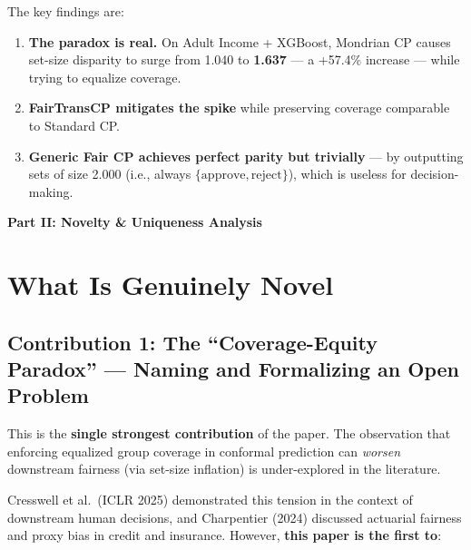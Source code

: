 \documentclass[11pt,a4paper]{article}
\begin{document}
\noindent The key findings are:

\begin{enumerate}[leftmargin=2em]
    \item \textbf{The paradox is real.} On Adult Income + XGBoost, Mondrian CP causes set-size disparity to surge from 1.040 to \textbf{1.637} --- a +57.4\% increase --- while trying to equalize coverage.
    \item \textbf{FairTransCP mitigates the spike} while preserving coverage comparable to Standard CP.
    \item \textbf{Generic Fair CP achieves perfect parity but trivially} --- by outputting sets of size 2.000 (i.e., always $\{\text{approve}, \text{reject}\}$), which is useless for decision-making.
\end{enumerate}


\newpage
\begin{center}
\Large\bfseries\color{sectioncolor} Part II: Novelty \& Uniqueness Analysis
\end{center}
\vspace{0.5cm}

\section{What Is Genuinely Novel}
\label{sec:novel}

\subsection{Contribution 1: The ``Coverage-Equity Paradox'' --- Naming and Formalizing an Open Problem}

\begin{strengthbox}
This is the \textbf{single strongest contribution} of the paper. The observation that enforcing equalized group coverage in conformal prediction can \emph{worsen} downstream fairness (via set-size inflation) is under-explored in the literature.
\end{strengthbox}

Cresswell et al.\ (ICLR 2025) demonstrated this tension in the context of downstream human decisions, and Charpentier (2024) discussed actuarial fairness and proxy bias in credit and insurance. However, \textbf{this paper is the first to}:
\end{document}
